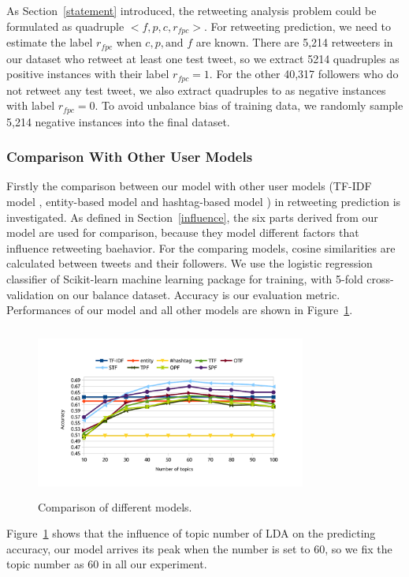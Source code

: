 \documentclass{acm_proc_article-sp}
\begin{document}
As Section~\ref{statement} introduced, the retweeting analysis problem could be formulated as quadruple $< f, p, c, r_{fpc} > $.
For retweeting prediction, we need to estimate the label $ r_{fpc} $ when $ c, p, \text{and } f $ are known. 
There are 5,214 retweeters in our dataset who retweet at least one test tweet, so we extract 5214 quadruples as positive instances with their label $ r_{fpc}=1 $.
For the other 40,317 followers who do not retweet any test tweet, we also extract quadruples to as negative instances with label $ r_{fpc}=0 $.
To avoid unbalance bias of training data, we randomly sample 5,214 negative instances into the final dataset.

\subsubsection{Comparison With Other User Models}
\label{comparison}
Firstly the comparison between our model with other user models (TF-IDF model \cite{Luo:2013RMF}, entity-based model and hashtag-based model \cite{Abel:2011AUM}) in retweeting prediction is investigated.
As defined in Section~\ref{influence}, the six parts derived from our model are used for comparison, because they model different factors that influence retweeting baehavior.
For the comparing models, cosine similarities are calculated between tweets and their followers.
We use the logistic regression classifier of Scikit-learn machine learning package \cite{scikit-learn} for training, with 5-fold cross-validation on our balance dataset. Accuracy is our evaluation metric.
Performances of our model and all other models are shown in Figure~\ref{fig:graph7}.
\begin{figure}[htb]
\centering
\includegraphics[width=3.5in,height=2.2in]{comparison.pdf}
\caption{Comparison of different models.}
\label{fig:graph7}
\end{figure}
Figure~\ref{fig:graph7} shows that the influence of topic number of LDA on the predicting accuracy, our model arrives its peak when the number is set to 60, so we fix the topic number as 60 in all our experiment.
\end{document}
